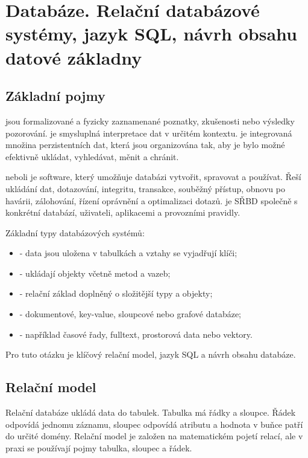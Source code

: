 \section{Databáze. Relační databázové systémy, jazyk SQL, návrh obsahu datové základny}

\subsection{Základní pojmy}
 jsou formalizované a fyzicky zaznamenané poznatky, zkušenosti nebo výsledky pozorování.
 je smysluplná interpretace dat v určitém kontextu.  je integrovaná
množina perzistentních dat, která jsou organizována tak, aby je bylo možné efektivně ukládat, vyhledávat,
měnit a chránit.

 neboli  je software, který umožňuje databázi vytvořit,
spravovat a používat. Řeší ukládání dat, dotazování, integritu, transakce, souběžný přístup, obnovu
po havárii, zálohování, řízení oprávnění a optimalizaci dotazů.  je SŘBD
společně s konkrétní databází, uživateli, aplikacemi a provozními pravidly.

Základní typy databázových systémů:
\begin{itemize}
  \item {} - data jsou uložena v tabulkách a vztahy se vyjadřují klíči;
  \item {} - ukládají objekty včetně metod a vazeb;
  \item {} - relační základ doplněný o složitější typy a objekty;
  \item {} - dokumentové, key-value, sloupcové nebo grafové databáze;
  \item {} - například časové řady, fulltext, prostorová data nebo vektory.
\end{itemize}

Pro tuto otázku je klíčový relační model, jazyk SQL a návrh obsahu databáze.

\subsection{Relační model}
Relační databáze ukládá data do tabulek. Tabulka má řádky a sloupce. Řádek odpovídá jednomu záznamu,
sloupec odpovídá atributu a hodnota v buňce patří do určité domény. Relační model je založen na
matematickém pojetí relací, ale v praxi se používají pojmy tabulka, sloupec a řádek.

